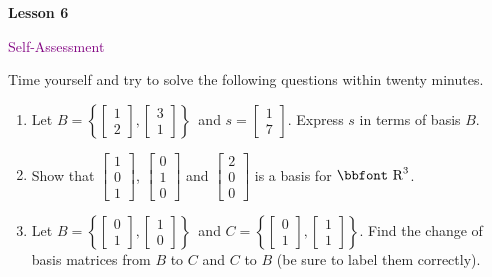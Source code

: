 \documentclass[10pt]{book}
\theoremstyle{definition}
\theoremstyle{remark}
\newcommand{\bbR}{\mathbb{R}}
\def\bbR{\mbox{\bbfont R}}
\begin{document}
\begin{tcolorbox}[
  width=\textwidth,
  colback=gray!10, %
  colframe=white, %
  boxrule=0pt,    %
  left=1cm,       %
  right=1cm,      %
  sharp corners  %
]

\begin{minipage}[t]{0.5\textwidth}
  \Huge \textbf{Lesson 6}
\end{minipage}%
\hfill
\begin{minipage}[t]{0.5\textwidth}
  \Huge\textcolor{purple}{Self-Assessment}
\end{minipage}
\end{tcolorbox}

\begin{large}
\noindent
Time yourself and try to solve the following questions within twenty minutes. 
\begin{enumerate}
\item Let $B = \left\{\begin{bmatrix} 1 \\ 2 \end{bmatrix}, \begin{bmatrix}3 \\ 1 \end{bmatrix} \right\}$\ and $s = \begin{bmatrix} 1 \\ 7 \end{bmatrix}$.  Express $s$ in terms of basis $B$.\vfil
\item Show that $\begin{bmatrix} 1 \\ 0\\1 \end{bmatrix}$, $\begin{bmatrix} 0 \\ 1\\0 \end{bmatrix}$ and $\begin{bmatrix}2 \\ 0\\0 \end{bmatrix}$ is a basis for $\bbR^3$.\vfil
\item Let $B = \left\{\begin{bmatrix} 0 \\ 1 \end{bmatrix}, \begin{bmatrix}1 \\ 0 \end{bmatrix}\right \}$\ and $C = \left\{\begin{bmatrix} 0 \\ 1 \end{bmatrix}, \begin{bmatrix}1 \\ 1 \end{bmatrix} \right\}$. Find the change of basis matrices from $B$ to $C$ and $C$ to $B$ (be sure to label them correctly).\vfil

\end{enumerate}
\end{large}
\end{document}
